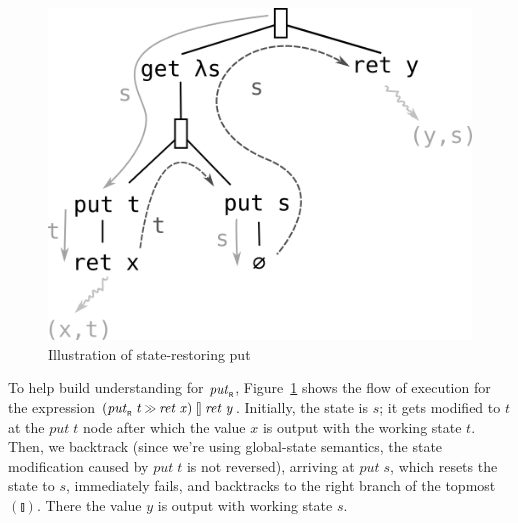 \documentclass{llncs}
\newcommand{\Varid}[1]{\mathit{#1}}
\let\Varid\mathit
\begin{document}
\begin{figure}
  \centering
  \includegraphics[scale=0.7]{sections/putR}
  \caption{Illustration of state-restoring put}
  \label{fig:putR}
\end{figure}


To help build understanding for \ensuremath{\Varid{put}_{\scaleobj{0.7}{\sf R}}},
Figure~\ref{fig:putR} shows the flow of execution for the expression
\ensuremath{(\Varid{put}_{\scaleobj{0.7}{\sf R}}\;\Varid{t}\mathbin{\hstretch{0.7}{>\!\!>}}\Varid{ret}\;\Varid{x})\mathbin{\talloblong}\Varid{ret}\;\Varid{y}}. Initially, the state is \ensuremath{\Varid{s}}; it gets
modified to \ensuremath{\Varid{t}} at the \ensuremath{\Varid{put}\;\Varid{t}} node after which the value \ensuremath{\Varid{x}} is output
with the working state \ensuremath{\Varid{t}}.
Then, we backtrack (since we're using global-state semantics, the state
modification caused by \ensuremath{\Varid{put}\;\Varid{t}} is not reversed), arriving at \ensuremath{\Varid{put}\;\Varid{s}}, which
resets the state to \ensuremath{\Varid{s}}, immediately fails, and backtracks to the right
branch of the topmost \ensuremath{(\talloblong)}. There the value \ensuremath{\Varid{y}} is output with working
state \ensuremath{\Varid{s}}.
\end{document}
